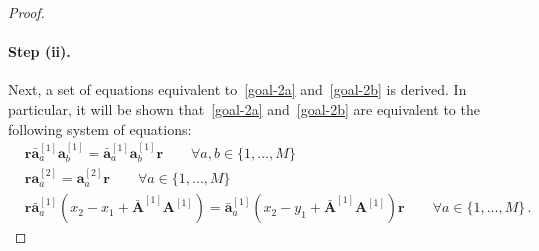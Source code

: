 \documentclass[11pt]{article}
\numberwithin{equation}{section}
\newcommand{\oad}{\mathbf{\bar{a}}}
\newcommand{\OA}{\mathbf{A}}
\newcommand{\OAD}{\mathbf{\bar{A}}}
\newcommand{\M}{M}
\begin{document}
\begin{proof}
\paragraph{Step (ii).} Next, a set of equations equivalent to~\eqref{goal-2a} and~\eqref{goal-2b} is derived. In particular, it  will be shown that~\eqref{goal-2a} and~\eqref{goal-2b} are equivalent to the following system of equations:
\begin{align}
				&\mathbf{r}{\oad}_{a}^{[1]}\mathbf{a}_{b}^{[1]}={\oad}_{a}^{[1]}\mathbf{a}_{b}^{[1]}\mathbf{r}\qquad \forall a,b \in \{1,\ldots,\M\}
    \label{set1} \\
		&\mathbf{r}\mathbf{a}_{a}^{[2]}=\mathbf{a}_{a}^{[2]}\mathbf{r}\qquad \forall a \in \{1,\ldots,\M\}
    \label{set2} \\
		&\mathbf{r}{\oad}_{a}^{[1]}(x_{2}-x_{1}+\OAD^{[1]}\OA^{[1]})={\oad}_{a}^{[1]}(x_{2}-y_{1}+\OAD^{[1]}\OA^{[1]})\mathbf{r}\qquad \forall a\in \{1,\ldots,\M\}\,.
    \label{set3}
        \end{align}


\end{proof}
\end{document}
